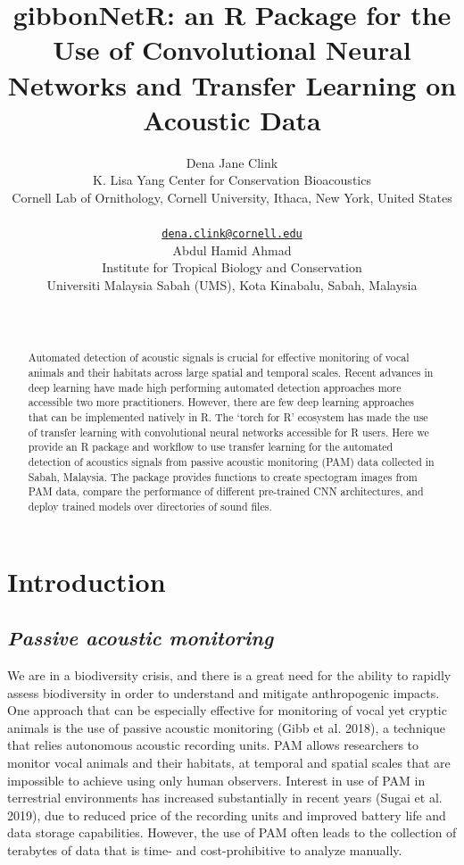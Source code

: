 \documentclass{article}
\title{gibbonNetR: an R Package for the Use of Convolutional Neural
Networks and Transfer Learning on Acoustic Data}
\author{
    Dena Jane Clink
   \\
    K. Lisa Yang Center for Conservation Bioacoustics \\
    Cornell Lab of Ornithology, Cornell University, Ithaca, New York,
United States \\
   \\
  \texttt{\href{mailto:dena.clink@cornell.edu}{\nolinkurl{dena.clink@cornell.edu}}} \\
   \And
    Abdul Hamid Ahmad
   \\
    Institute for Tropical Biology and Conservation \\
    Universiti Malaysia Sabah (UMS), Kota Kinabalu, Sabah, Malaysia \\
   \\
  \texttt{} \\
  }
\begin{document}
\maketitle


\begin{abstract}
Automated detection of acoustic signals is crucial for effective
monitoring of vocal animals and their habitats across large spatial and
temporal scales. Recent advances in deep learning have made high
performing automated detection approaches more accessible two more
practitioners. However, there are few deep learning approaches that can
be implemented natively in R. The `torch for R' ecosystem has made the
use of transfer learning with convolutional neural networks accessible
for R users. Here we provide an R package and workflow to use transfer
learning for the automated detection of acoustics signals from passive
acoustic monitoring (PAM) data collected in Sabah, Malaysia. The package
provides functions to create spectogram images from PAM data, compare
the performance of different pre-trained CNN architectures, and deploy
trained models over directories of sound files.
\end{abstract}


\hypertarget{introduction}{%
\section{Introduction}\label{introduction}}

\hypertarget{passive-acoustic-monitoring}{%
\subsection{\texorpdfstring{\emph{Passive acoustic
monitoring}}{Passive acoustic monitoring}}\label{passive-acoustic-monitoring}}

We are in a biodiversity crisis, and there is a great need for the
ability to rapidly assess biodiversity in order to understand and
mitigate anthropogenic impacts. One approach that can be especially
effective for monitoring of vocal yet cryptic animals is the use of
passive acoustic monitoring (Gibb et al. 2018), a technique that relies
autonomous acoustic recording units. PAM allows researchers to monitor
vocal animals and their habitats, at temporal and spatial scales that
are impossible to achieve using only human observers. Interest in use of
PAM in terrestrial environments has increased substantially in recent
years (Sugai et al. 2019), due to reduced price of the recording units
and improved battery life and data storage capabilities. However, the
use of PAM often leads to the collection of terabytes of data that is
time- and cost-prohibitive to analyze manually.
\end{document}
